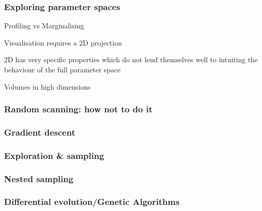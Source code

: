 \documentclass[aspectratio=169]{beamer}
\begin{document}
\begin{frame}
    \frametitle{Exploring parameter spaces}
    Profiling vs Marginalising

    Visualisation requires a 2D projection

    2D has very specific properties which do not lend themselves well to intuiting the behaviour of the full parameter space

    Volumes in high dimensions
    
\end{frame}

\begin{frame}
    \frametitle{Random scanning: how not to do it}
    
\end{frame}

\begin{frame}
    \frametitle{Gradient descent}
\end{frame}

\begin{frame}
    \frametitle{Exploration \& sampling}
\end{frame}

\begin{frame}
    \frametitle{Nested sampling}
\end{frame}

\begin{frame}
    \frametitle{Differential evolution/Genetic Algorithms}
    
\end{frame}

{
    \begin{frame}[plain]
    \end{frame}
}
\end{document}
